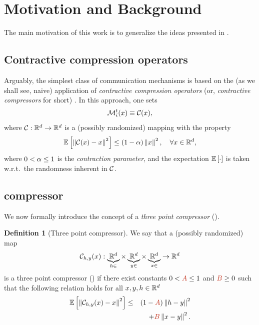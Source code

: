 \documentclass[nohyperref]{article}
\theoremstyle{plain}
\theoremstyle{definition}
\newtheorem{definition}[theorem]{Definition}
\theoremstyle{remark}
\begin{document}
\section{Motivation and Background}
\label{sec:mot_and_back}
The main motivation of this work is to generalize the ideas presented in \cite{LAG, LENA, 3PC}.

\subsection{Contractive compression operators} \label{sub:contractive}

Arguably, the simplest class of communication mechanisms is based on the (as we shall see, naive) application of {\em contractive  compression operators} (or, {\em contractive compressors} for short) \cite{Koloskova2019DecentralizedDL, beznosikov2020biased}. In this approach, one sets
\begin{equation}\label{eq:b9fd-98ybhkfd}{\cal M}_i^t(x) \equiv \mathcal{C}(x),\end{equation}
where $\mathcal{C}:\mathbb R^d \to \mathbb R^d$ is a (possibly randomized) mapping with the property 
\begin{equation}\label{eq:contractive-09u09fduf}{\mathbb E}\left[\left\| \mathcal{C}(x)-x \right\|^2\right] \leq (1- \alpha) \left\| x \right\|^2, \quad \forall x\in \mathbb R^d,\end{equation}
where $0<\alpha\leq 1$ is the {\em contraction parameter}, and the expectation ${\mathbb E}\left[\cdot\right]$ is taken w.r.t.\ the randomness inherent in $\mathcal{C}$.  

\subsection{ compressor}

We now formally introduce the concept of a {\em three point compressor} ().

\begin{definition}[Three point compressor]\label{def:ttp}
	We say that a (possibly randomized) map $$\mathcal{C}_{h,y}(x): \underbrace{\mathbb R^d}_{h\in} \times \underbrace{\mathbb R^d}_{y\in} \times \underbrace{\mathbb R^d}_{x\in} \rightarrow \mathbb R^d$$ is a 
	three point compressor () if there exist constants $0<\thetaNEW \le 1$ and $\betaNEW \ge 0$ such that the following relation holds for all $x, y, h \in \mathbb R^d$
	\begin{eqnarray}
		\Exp{\sqnorm{\cC_{h,y}(x) - x }} & \leq & (1 - \thetaNEW)\sqnorm{h - y}  \notag \\
		&& \quad + \betaNEW \sqnorm{x-y}.\label{eq:ttp}
	\end{eqnarray}
\end{definition}
\end{document}
